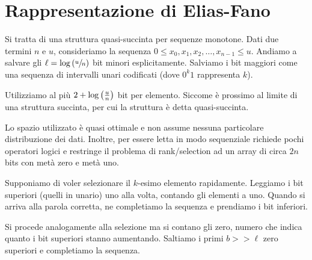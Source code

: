 \documentclass[\main/main.tex]{subfiles}
\begin{document}
\section{Rappresentazione di Elias-Fano}
\begin{multicols}{2}
\begin{definition}
    Si tratta di una struttura quasi-succinta per sequenze monotone. Dati due termini \(n\) e \(u\), consideriamo la sequenza \(0 \leq x_0, x_1, x_2, \ldots, x_{n-1} \leq u\). Andiamo a salvare gli \(\ell = \log\left(\sfrac{u}{n}\right)\) bit minori esplicitamente. Salviamo i bit maggiori come una sequenza di intervalli unari codificati (dove \(0^k 1\) rappresenta \(k\)).
    
    Utilizziamo al più \(2+\log\left(\frac{u}{n}\right)\) bit per elemento. Siccome è prossimo al limite di una struttura succinta, per cui la struttura è detta quasi-succinta.
\end{definition}
\begin{observation}
    Lo spazio utilizzato è quasi ottimale e non assume nessuna particolare distribuzione dei dati. Inoltre, per essere letta in modo sequenziale richiede pochi operatori logici e restringe il problema di rank/selection ad un array di circa \(2n\) bits con metà zero e metà uno.
\end{observation}
\begin{definition}
    Supponiamo di voler selezionare il \(k\)-esimo elemento rapidamente. Leggiamo i bit superiori (quelli in unario) uno alla volta, contando gli elementi a uno. Quando si arriva alla parola corretta, ne completiamo la sequenza e prendiamo i bit inferiori.
\end{definition}
\begin{definition}
    Si procede analogamente alla selezione ma si contano gli zero, numero che indica quanto i bit superiori stanno aumentando. Saltiamo i primi \(b >> \ell\) zero superiori e completiamo la sequenza.
\end{definition}
\end{multicols}
\end{document}
